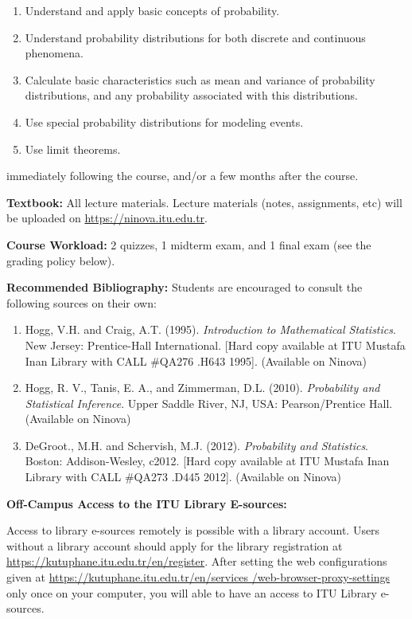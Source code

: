\documentclass[
  12pt,
]{article}
\providecommand{\tightlist}{%
  \setlength{\itemsep}{0pt}\setlength{\parskip}{0pt}}
\begin{document}
\begin{enumerate}
\def\labelenumi{\arabic{enumi}.}
\tightlist
\item
  Understand and apply basic concepts of probability.
\item
  Understand probability distributions for both discrete and continuous
  phenomena.
\item
  Calculate basic characteristics such as mean and variance of
  probability distributions, and any probability associated with this
  distributions.
\item
  Use special probability distributions for modeling events.
\item
  Use limit theorems.
\end{enumerate}

immediately following the course, and/or a few months after the course.

\textbf{Textbook:} All lecture materials. Lecture materials (notes,
assignments, etc) will be uploaded on
\href{Ninova}{https://ninova.itu.edu.tr}.

\textbf{Course Workload:} 2 quizzes, 1 midterm exam, and 1 final exam
(see the grading policy below).

\textbf{Recommended Bibliography:} Students are encouraged to consult
the following sources on their own:

\begin{enumerate}
\def\labelenumi{\arabic{enumi}.}
\tightlist
\item
  Hogg, V.H. and Craig, A.T. (1995).
  \textit{Introduction to Mathematical Statistics}. New Jersey:
  Prentice-Hall International. {[}Hard copy available at ITU Mustafa
  Inan Library with CALL \#QA276 .H643 1995{]}. (Available on Ninova)
\item
  Hogg, R. V., Tanis, E. A., and Zimmerman, D.L. (2010).
  \textit{Probability and Statistical Inference}. Upper Saddle River,
  NJ, USA: Pearson/Prentice Hall. (Available on Ninova)
\item
  DeGroot., M.H. and Schervish, M.J. (2012).
  \textit{Probability and Statistics}. Boston: Addison-Wesley, c2012.
  {[}Hard copy available at ITU Mustafa Inan Library with CALL \#QA273
  .D445 2012{]}. (Available on Ninova)
\end{enumerate}

\textbf{Off-Campus Access to the ITU Library E-sources:}

Access to library e-sources remotely is possible with a library account.
Users without a library account should apply for the library
registration at
\href{Library register}{https://kutuphane.itu.edu.tr/en/register}. After
setting the web configurations given at
\href{Proxy}{https://kutuphane.itu.edu.tr/en/services \linebreak /web-browser-proxy-settings}
only once on your computer, you will able to have an access to ITU
Library e-sources.
\end{document}
